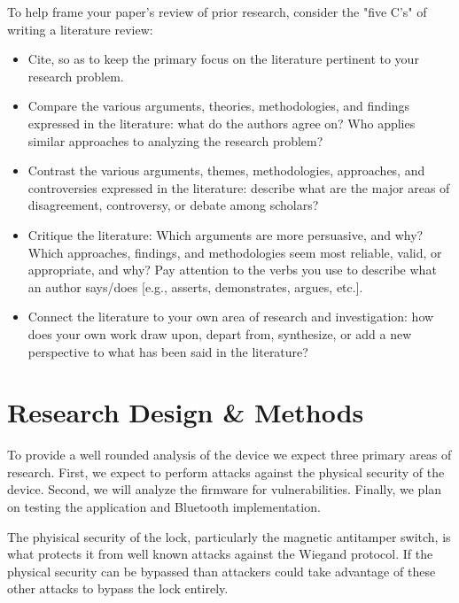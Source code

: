 \documentclass[10pt,twocolumn,letterpaper]{article}
\begin{document}
To help frame your paper's review of prior research, consider the "five C’s" of writing a literature review:
\begin{itemize}
    \item Cite, so as to keep the primary focus on the literature pertinent to your research problem.
    \item Compare the various arguments, theories, methodologies, and findings expressed in the literature: what do the authors agree on? Who applies similar approaches to analyzing the research problem?
    \item Contrast the various arguments, themes, methodologies, approaches, and controversies expressed in the literature: describe what are the major areas of disagreement, controversy, or debate among scholars?
    \item Critique the literature: Which arguments are more persuasive, and why? Which approaches, findings, and methodologies seem most reliable, valid, or appropriate, and why? Pay attention to the verbs you use to describe what an author says/does [e.g., asserts, demonstrates, argues, etc.].
    \item Connect the literature to your own area of research and investigation: how does your own work draw upon, depart from, synthesize, or add a new perspective to what has been said in the literature?
\end{itemize}
    

\section{Research Design \& Methods}
To provide a well rounded analysis of the device we expect three primary areas of research.  First, we expect to perform attacks against the physical security of the device.  Second, we will analyze the firmware for vulnerabilities.  Finally, we plan on testing the application and Bluetooth implementation.

The phyisical security of the lock, particularly the magnetic antitamper switch, is what protects it from well known attacks against the Wiegand protocol.  If the physical security can be bypassed than attackers could take advantage of these other attacks to bypass the lock entirely.
\end{document}
